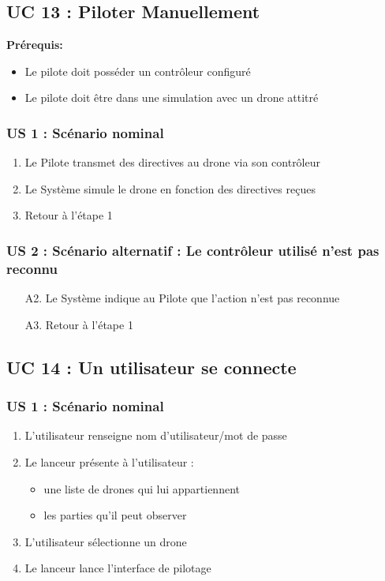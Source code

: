 \documentclass{scrartcl}
\begin{document}
\subsection{UC 13 : Piloter Manuellement}
\textbf{Prérequis:}
\begin{itemize}
    \item Le pilote doit posséder un contrôleur configuré
    \item Le pilote doit être dans une simulation avec un drone attitré
\end{itemize}

\subsubsection*{US 1 : Scénario nominal}
\begin{enumerate}
    \item Le Pilote transmet des directives au drone via son contrôleur
    \item Le Système simule le drone en fonction des directives reçues
    \item Retour à l'étape 1
\end{enumerate}

\subsubsection*{US 2 : Scénario alternatif : Le contrôleur utilisé n'est pas reconnu}
\begin{enumerate}
    \item[A2.] Le Système indique au Pilote que l'action n'est pas reconnue
    \item[A3.] Retour à l'étape 1
\end{enumerate}

\subsection{UC 14 : Un utilisateur se connecte}

\subsubsection*{US 1 : Scénario nominal}
\begin{enumerate}
    \item L'utilisateur renseigne nom d'utilisateur/mot de passe
    \item Le lanceur présente à l'utilisateur :
        \begin{itemize}
            \item une liste de drones qui lui appartiennent
            \item les parties qu'il peut observer
        \end{itemize}
    \item L'utilisateur sélectionne un drone
    \item Le lanceur lance l'interface de pilotage
\end{enumerate}
\end{document}
